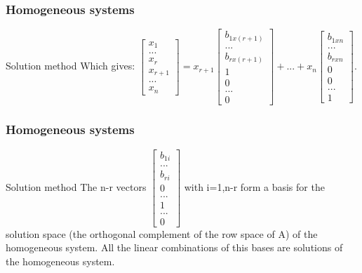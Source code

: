 \begin{frame}
	\frametitle{Homogeneous systems}
	\begin{block}{Solution method}
		Which gives:
		$\begin{bmatrix}
			x_1\\...\\x_r\\x_{r+1}\\...\\x_n
		\end{bmatrix}=x_{r+1}\begin{bmatrix}
		b_{1x(r+1)}\\...\\b_{rx(r+1)}\\1\\0\\...\\0
		\end{bmatrix}+...+x_n\begin{bmatrix}
		b_{1xn}\\...\\b_{rxn}\\0\\0\\...\\1
		\end{bmatrix}$. 
	\end{block}
\end{frame}

\begin{frame}
	\frametitle{Homogeneous systems}
	\begin{block}{Solution method}
		The n-r vectors $\begin{bmatrix} b_{1i}\\...\\b_{ri}\\0\\...\\1\\...\\0 \end{bmatrix}$ with i=1,n-r form a basis for the solution space (the orthogonal complement of the row space of A) of the homogeneous system. All the linear combinations of this bases are solutions of the homogeneous system. 
	\end{block}
\end{frame}

